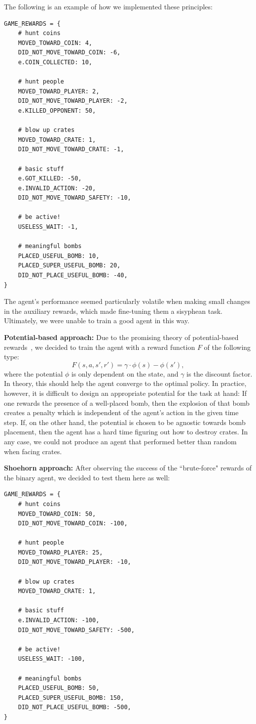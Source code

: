 \documentclass{article}
\begin{document}
The following is an example of how we implemented these principles:

\begin{verbatim}
GAME_REWARDS = {
    # hunt coins
    MOVED_TOWARD_COIN: 4,
    DID_NOT_MOVE_TOWARD_COIN: -6,
    e.COIN_COLLECTED: 10,

    # hunt people
    MOVED_TOWARD_PLAYER: 2,
    DID_NOT_MOVE_TOWARD_PLAYER: -2,
    e.KILLED_OPPONENT: 50,

    # blow up crates
    MOVED_TOWARD_CRATE: 1,
    DID_NOT_MOVE_TOWARD_CRATE: -1,

    # basic stuff
    e.GOT_KILLED: -50,
    e.INVALID_ACTION: -20,
    DID_NOT_MOVE_TOWARD_SAFETY: -10,

    # be active!
    USELESS_WAIT: -1,

    # meaningful bombs
    PLACED_USEFUL_BOMB: 10,
    PLACED_SUPER_USEFUL_BOMB: 20,
    DID_NOT_PLACE_USEFUL_BOMB: -40,
}
\end{verbatim}

The agent's performance seemed particularly volatile when making small changes in the auxiliary rewards, which made fine-tuning them a sisyphean task. Ultimately, we were unable to train a good agent in this way.

\textbf{Potential-based approach:} Due to the promising theory of potential-based rewards~\cite{potential-reward}, we decided to train the agent with a reward function $F$ of the following type:
\[
F(s, a ,s', r') =  \gamma \cdot \phi(s) - \phi(s'),
\]
where the potential $\phi$ is only dependent on the state, and $\gamma$ is the discount factor. In theory, this should help the agent converge to the optimal policy. In practice, however, it is difficult to design an appropriate potential for the task at hand: If one rewards the presence of a well-placed bomb, then the explosion of that bomb creates a penalty which is independent of the agent's action in the given time step. If, on the other hand, the potential is chosen to be agnostic towards bomb placement, then the agent has a hard time figuring out how to destroy crates. In any case, we could not produce an agent that performed better than random when facing crates.

\textbf{Shoehorn approach:} After observing the success of the ``brute-force" rewards of the binary agent, we decided to test them here as well:

\begin{verbatim}
GAME_REWARDS = {
    # hunt coins
    MOVED_TOWARD_COIN: 50,
    DID_NOT_MOVE_TOWARD_COIN: -100,

    # hunt people
    MOVED_TOWARD_PLAYER: 25,
    DID_NOT_MOVE_TOWARD_PLAYER: -10,

    # blow up crates
    MOVED_TOWARD_CRATE: 1,

    # basic stuff
    e.INVALID_ACTION: -100,
    DID_NOT_MOVE_TOWARD_SAFETY: -500,

    # be active!
    USELESS_WAIT: -100,

    # meaningful bombs
    PLACED_USEFUL_BOMB: 50,
    PLACED_SUPER_USEFUL_BOMB: 150,
    DID_NOT_PLACE_USEFUL_BOMB: -500,
}
\end{verbatim}
\end{document}
